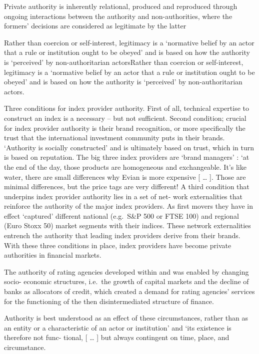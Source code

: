 \documentclass[
]{book}
\begin{document}
Private authority is inherently relational, produced and
reproduced through ongoing interactions between the authority and non-authorities,
where the formers' decisions are considered as legitimate by the latter

Rather than coercion or self-interest, legitimacy is a `normative belief
by an actor that a rule or institution ought to be obeyed' and is based on how the
authority is `perceived' by non-authoritarian actorsRather than coercion or self-interest,
legitimacy is a `normative belief by an actor that a rule or institution ought to be obeyed'
and is based on how the authority is `perceived' by non-authoritarian actors.

Three conditions for index provider authority.
First of all, technical expertise to construct an index is a necessary -- but not sufficient.
Second condition; crucial for index provider authority is their brand recognition,
or more specifically the trust that the international investment community puts in their brands.
`Authority is socially constructed' and is ultimately based on
trust, which in turn is based on reputation.
The big three index providers are `brand managers'
: `at the end of the day, those products are homogeneous and exchangeable.
It's like water, there are small differences why Evian is more expensive {[} \ldots{} {]}.
Those are minimal differences, but the price tags are very different!
A third condition that underpins index provider authority lies in a set of net-
work externalities that reinforce the authority of the major index providers. As first
movers they have in effect `captured' different national (e.g.~S\&P 500 or FTSE 100)
and regional (Euro Stoxx 50) market segments with their indices.
These network externalities entrench the authority
that leading index providers derive from their brands. With these three conditions in
place, index providers have become private authorities in financial markets.

The authority of rating agencies developed within and was enabled by changing socio-
economic structures, i.e.~the growth of capital markets and the decline of banks as
allocators of credit, which created a demand for rating agencies' services for the
functioning of the then disintermediated structure of finance.

Authority is best understood as an effect of these circumstances, rather than as an entity or a
characteristic of an actor or institution' and `its existence is therefore not func-
tional, {[} \ldots{} {]} but always contingent on time, place, and circumstance.
\end{document}
